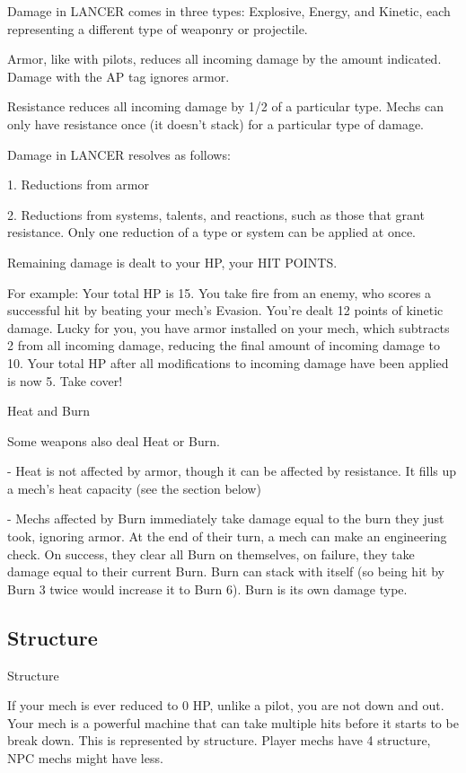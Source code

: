 Damage in LANCER comes in three types: Explosive, Energy, and Kinetic, each representing a
different type of weaponry or projectile.


Armor, like with pilots, reduces all incoming damage by the amount indicated. Damage with the
AP tag ignores armor.

Resistance reduces all incoming damage by 1/2 of a particular type. Mechs can only have
resistance once (it doesn’t stack) for a particular type of damage.


Damage in LANCER resolves as follows:

             1.  Reductions from armor

             2.  Reductions from systems, talents, and reactions, such as those that grant
                 resistance. Only one reduction of a type or system can be applied at once.

Remaining damage is dealt to your HP, your HIT POINTS.


For example: Your total HP is  15. You take fire from an enemy, who scores a successful hit by
beating your mech’s Evasion. You’re dealt 12 points of kinetic damage. Lucky for you, you have
armor installed on your mech, which subtracts 2 from all incoming damage, reducing the final
amount of incoming damage to  10. Your total HP after all modifications to incoming damage
have been applied is now 5. Take cover!

                                               Heat and Burn

Some weapons also deal Heat or Burn.

    -    Heat is not affected by armor, though it can be affected by resistance. It fills up a mech’s
         heat capacity (see the section below)

    -    Mechs affected by Burn immediately take damage equal to the burn they just took,
         ignoring armor. At the end of their turn, a mech can make an engineering check. On
        success, they clear all Burn on themselves, on failure, they take damage equal to their
        current Burn. Burn can stack with itself (so being hit by Burn 3 twice would increase it to
         Burn 6). Burn is its own damage type.

\subsection{Structure}
                                                Structure

If your mech is ever reduced to 0 HP, unlike a pilot, you are not down and out. Your mech is a
powerful machine that can take multiple hits before it starts to be break down. This is
represented by structure. Player mechs have 4 structure, NPC mechs might have less.





